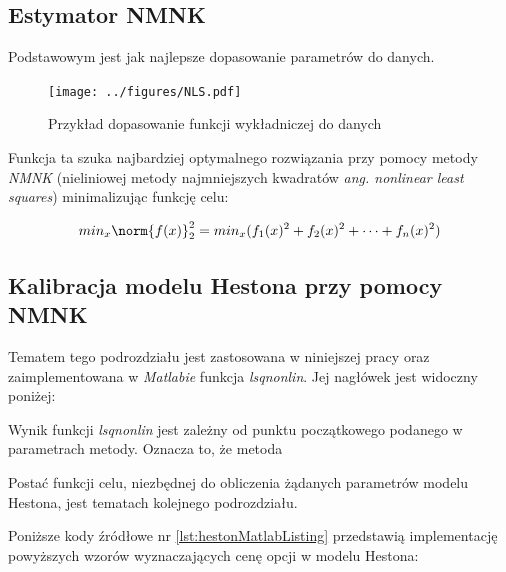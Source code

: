 \documentclass{pracamgr}
\begin{document}
\subsection{Estymator NMNK}
Podstawowym jest jak najlepsze dopasowanie parametrów do danych. 



\begin{figure}
  \centering
  \texttt{[image: ../figures/NLS.pdf]}
  \caption{Przykład dopasowanie funkcji wykładniczej do danych}
  \label{fig:volatilitySurface}
\end{figure}

Funkcja ta szuka najbardziej optymalnego rozwiązania przy pomocy metody \textit{NMNK} (nieliniowej metody najmniejszych 
kwadratów \textit{ang. nonlinear least squares}) minimalizując funkcję celu:

\begin{equation}
  min_x \norm{f(x)}^2_2 = min_x(f_1(x)^2 + f_2(x)^2 + \cdots + f_n(x)^2)
\end{equation}





\subsection{Kalibracja modelu Hestona przy pomocy NMNK}

Tematem tego podrozdziału jest zastosowana w niniejszej pracy oraz zaimplementowana w \textit{Matlabie} 
funkcja \textit{lsqnonlin}. Jej nagłówek jest widoczny poniżej:





Wynik funkcji \textit{lsqnonlin} jest zależny od punktu początkowego podanego w parametrach metody. Oznacza to, że 
metoda  

Postać funkcji celu, niezbędnej do obliczenia żądanych parametrów modelu Hestona, 
jest tematach kolejnego podrozdziału.



Poniższe kody źródłowe nr \ref{lst:hestonMatlabListing} \cite{HestonMatlab} przedstawią implementację powyższych wzorów wyznaczających cenę opcji w modelu Hestona:
\end{document}
